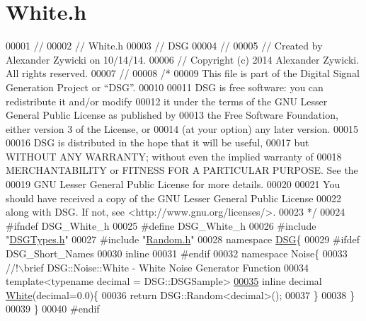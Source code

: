 \hypertarget{_white_8h_source}{\section{White.\+h}
\label{_white_8h_source}
}

\begin{DoxyCode}
00001 \textcolor{comment}{//}
00002 \textcolor{comment}{//  White.h}
00003 \textcolor{comment}{//  DSG}
00004 \textcolor{comment}{//}
00005 \textcolor{comment}{//  Created by Alexander Zywicki on 10/14/14.}
00006 \textcolor{comment}{//  Copyright (c) 2014 Alexander Zywicki. All rights reserved.}
00007 \textcolor{comment}{//}
00008 \textcolor{comment}{/*}
00009 \textcolor{comment}{ This file is part of the Digital Signal Generation Project or “DSG”.}
00010 \textcolor{comment}{}
00011 \textcolor{comment}{ DSG is free software: you can redistribute it and/or modify}
00012 \textcolor{comment}{ it under the terms of the GNU Lesser General Public License as published by}
00013 \textcolor{comment}{ the Free Software Foundation, either version 3 of the License, or}
00014 \textcolor{comment}{ (at your option) any later version.}
00015 \textcolor{comment}{}
00016 \textcolor{comment}{ DSG is distributed in the hope that it will be useful,}
00017 \textcolor{comment}{ but WITHOUT ANY WARRANTY; without even the implied warranty of}
00018 \textcolor{comment}{ MERCHANTABILITY or FITNESS FOR A PARTICULAR PURPOSE.  See the}
00019 \textcolor{comment}{ GNU Lesser General Public License for more details.}
00020 \textcolor{comment}{}
00021 \textcolor{comment}{ You should have received a copy of the GNU Lesser General Public License}
00022 \textcolor{comment}{ along with DSG.  If not, see <http://www.gnu.org/licenses/>.}
00023 \textcolor{comment}{ */}
00024 \textcolor{preprocessor}{#ifndef DSG\_White\_h}
00025 \textcolor{preprocessor}{#define DSG\_White\_h}
00026 \textcolor{preprocessor}{#include "\hyperlink{_d_s_g_types_8h}{DSGTypes.h}"}
00027 \textcolor{preprocessor}{#include "\hyperlink{_random_8h}{Random.h}"}
00028 \textcolor{keyword}{namespace }\hyperlink{namespace_d_s_g}{DSG}\{
00029 \textcolor{preprocessor}{#ifdef DSG\_Short\_Names}
00030     \textcolor{keyword}{inline}
00031 \textcolor{preprocessor}{#endif}
00032     \textcolor{keyword}{namespace }Noise\{\textcolor{comment}{}
00033 \textcolor{comment}{        //!\(\backslash\)brief DSG::Noise::White - White Noise Generator Function}
00034 \textcolor{comment}{}        \textcolor{keyword}{template}<\textcolor{keyword}{typename} decimal = DSG::DSGSample>
\hypertarget{_white_8h_source_l00035}{}\hyperlink{namespace_d_s_g_1_1_noise_a0d1c4b4522d2e56b1aa604e45ab92066}{00035}         \textcolor{keyword}{inline} decimal \hyperlink{namespace_d_s_g_1_1_noise_a0d1c4b4522d2e56b1aa604e45ab92066}{White}(decimal=0.0)\{
00036             \textcolor{keywordflow}{return} DSG::Random<decimal>();
00037         \}
00038     \}
00039 \}
00040 \textcolor{preprocessor}{#endif}
\end{DoxyCode}
